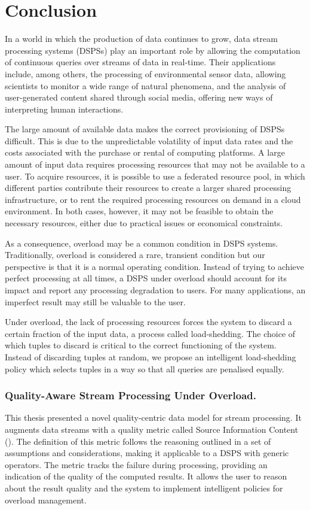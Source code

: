 \chapter{Conclusion}
\label{ch:conclusion}

In a world in which the production of data continues to grow, data stream processing systems (DSPSs) play
an important role by allowing the computation of continuous queries over streams of data in real-time.
Their applications include, among others, the processing of environmental sensor data, allowing
scientists to monitor a wide range of natural phenomena, and the analysis of user-generated content
shared through social media, offering new ways of interpreting human interactions.

The large amount of available data makes the correct provisioning of DSPSs difficult. This is
due to the unpredictable volatility of input data rates and the costs associated with the purchase or
rental of computing platforms. A large amount of input data requires processing resources that may
not be available to a user. To acquire resources, it is possible
to use a federated resource pool, in which different parties contribute their resources to
create a larger shared processing infrastructure, or to rent the required processing resources on demand
in a cloud environment. In both cases, however, it may not be feasible to obtain the necessary resources,
either due to practical issues or economical constraints.

As a consequence, overload may be a common condition in DSPS systems.
Traditionally, overload is considered a rare, transient condition but our perspective is that it is a
normal operating condition. Instead of trying to achieve perfect processing at all times, a DSPS under
overload should account for its impact and report any processing degradation to users. For many
applications, an imperfect result may still be valuable to the user.

Under overload, the lack of processing resources forces the system to discard a certain fraction of the
input data, a process called load-shedding. The choice of which tuples to discard is critical to the
correct functioning of the system.
Instead of discarding tuples at random, we propose an intelligent load-shedding
policy which selects tuples in a way so that all queries are penalised equally.

\subsection*{Quality-Aware Stream Processing Under Overload.}
\vspace{-25pt}
This thesis presented a novel quality-centric data model for stream processing. It augments
data streams with a quality metric called Source Information Content (\sic). 
The definition of this metric follows the reasoning outlined in a set of
assumptions and considerations, making it applicable to a DSPS with
generic operators.
The \sic metric tracks the failure during processing, providing an indication of the
quality of the computed results. 
It allows the user to reason about the result quality and the system to
implement intelligent policies for overload management.

